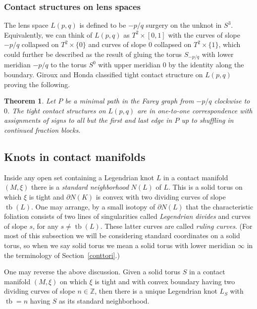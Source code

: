 \documentclass[11pt]{amsart}
\theoremstyle{plain}
\newtheorem{theorem}{Theorem}
\theoremstyle{definition}
\theoremstyle{remark}
\numberwithin{theorem}{section}
\newcommand{\dfn}[1]{{\em #1}}        %
\newcommand{\Z}{\mathbb{Z}}           %
\DeclareMathOperator\tb{tb}                   %
\begin{document}
\subsubsection{Contact structures on lens spaces}
The lens space $L(p,q)$ is defined to be $-p/q$ surgery on the unknot in $S^3$. Equivalently, we can think of $L(p,q)$ as $T^2\times [0,1]$ with the curves of slope $-p/q$ collapsed on $T^2\times\{0\}$ and curves of slope $0$ collapsed on $T^2\times\{1\}$, which could further be described as the result of gluing the torus $S_{-p/q}$ with lower meridian $-p/q$ to the torus $S^0$ with upper meridian $0$ by the identity along the boundary. Giroux \cite{Giroux2} and Honda \cite{Honda00a} classified tight contact structure on $L(p,q)$ proving the following. 
\begin{theorem}
Let $P$ be a minimal path in the Farey graph from $-p/q$ clockwise to $0$. The tight contact structures on $L(p,q)$ are in one-to-one correspondence with assignments of signs to all but the first and last edge in $P$ up to shuffling in continued fraction blocks. 
\end{theorem}



\subsection{Knots in contact manifolds}\label{kot}
Inside any open set containing a Legendrian knot $L$ in a contact manifold $(M,\xi)$ there is a \dfn{standard neighborhood} $N(L)$ of $L$. This is a solid torus on which $\xi$ is tight and $\partial N(K)$ is convex with two dividing curves of slope $\tb(L)$. One may arrange, by a small isotopy of $\partial N(L)$ that the characteristic foliation consists of two lines of singularities called \dfn{Legendrian divides} and curves of slope $s$, for any $s\not=\tb(L)$. These latter curves are called \dfn{ruling curves}. (For most of this subsection we will be considering standard coordinates on a solid torus, so when we say solid torus we mean a solid torus with lower meridian $\infty$ in the terminology of Section~\ref{conttori}.) 

One may reverse the above discussion. Given a solid torus $S$ in a contact manifold $(M,\xi)$ on which $\xi$ is tight and with convex boundary having two dividing curves of slope $n\in\Z$, then there is a unique Legendrian knot $L_S$ with $\tb=n$ having $S$ as its standard neighborhood. 
\end{document}
